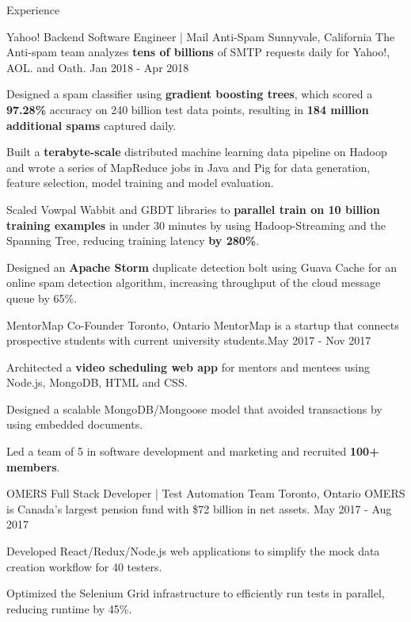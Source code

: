 \documentclass{resume} %
\begin{document}
\begin{rSection}{Experience}

\begin{expSec}
{Yahoo!}
{Backend Software Engineer | Mail Anti-Spam}
{Sunnyvale, California}
{The Anti-spam team analyzes \textbf{tens of billions} of SMTP requests daily for Yahoo!, AOL. and Oath.}
{Jan 2018 - Apr 2018}
\item Designed a spam classifier using \textbf{gradient boosting trees}, which scored a \textbf{97.28\%} accuracy on 240 billion test data points, resulting in \textbf{184 million additional spams} captured daily.
\item Built a \textbf{terabyte-scale} distributed machine learning data pipeline on Hadoop and wrote a series of MapReduce jobs in Java and Pig for data generation, feature selection, model training and model evaluation.
\item Scaled Vowpal Wabbit and GBDT libraries to \textbf{parallel train on 10 billion training examples} in under 30 minutes by using Hadoop-Streaming and the Spanning Tree, reducing training latency \textbf{by 280\%}.
\item Designed an \textbf{Apache Storm} duplicate detection bolt using Guava Cache for an online spam detection algorithm, increasing throughput of the cloud message queue by 65\%.

\end{expSec}

\begin{expSec}
{MentorMap}
{Co-Founder \href{https://www.mentormap.ca/}{\space\small\faExternalLink}}
{Toronto, Ontario}
{MentorMap is a startup that connects prospective students with current university students.}{May 2017 - Nov 2017}
\item Architected a \textbf{video scheduling web app} for mentors and mentees using Node.js, MongoDB, HTML and CSS.
\item Designed a scalable MongoDB/Mongoose model that avoided transactions by using embedded documents.
\item Led a team of 5 in software development and marketing and recruited \textbf{100+ members}.
\end{expSec}

\begin{expSec}
{OMERS}
{Full Stack Developer | Test Automation Team}
{Toronto, Ontario}
{OMERS is Canada's largest pension fund with \$72 billion in net assets.}
{May 2017 - Aug 2017}
\item Developed React/Redux/Node.js web applications to simplify the mock data creation workflow for 40 testers.
\item Optimized the Selenium Grid infrastructure to efficiently run tests in parallel, reducing runtime by 45\%. \end{expSec}

\end{rSection}
\end{document}
